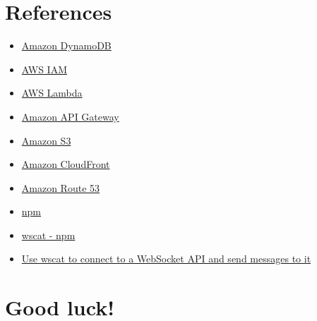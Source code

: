 \documentclass{article}
\begin{document}
\section{References}\label{references}
\begin{itemize}
  \item \href{https://docs.aws.amazon.com/amazondynamodb/latest/developerguide/Introduction.html}{Amazon DynamoDB}
  \item \href{https://docs.aws.amazon.com/IAM/latest/UserGuide/introduction.html}{AWS IAM}
  \item \href{https://docs.aws.amazon.com/lambda/latest/dg/welcome.html}{AWS Lambda}
  \item \href{https://docs.aws.amazon.com/apigateway/latest/developerguide/welcome.html}{Amazon API Gateway}
  \item \href{https://docs.aws.amazon.com/AmazonS3/latest/userguide/Welcome.html}{Amazon S3}
  \item \href{https://docs.aws.amazon.com/AmazonCloudFront/latest/DeveloperGuide/Introduction.html}{Amazon CloudFront}
  \item \href{https://docs.aws.amazon.com/Route53/latest/DeveloperGuide/Welcome.html}{Amazon Route 53}
  \item \href{https://docs.npmjs.com/downloading-and-installing-node-js-and-npm}{npm}
  \item \href{https://www.npmjs.com/package/wscat}{wscat - npm}
  \item \href{https://docs.aws.amazon.com/apigateway/latest/developerguide/apigateway-how-to-call-websocket-api-wscat.html}{Use wscat to connect to a WebSocket API and send messages to it}
\end{itemize}
\section*{Good luck!}
\end{document}
